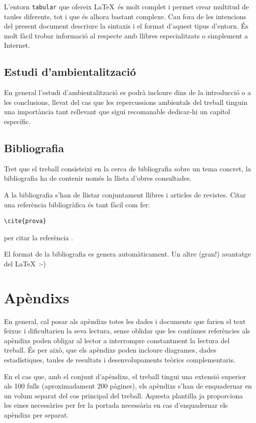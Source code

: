 L'entorn \texttt{tabular} que ofereix \LaTeX \ és molt complet i permet crear multitud de taules diferents, tot i que és alhora bastant complexe. Cau fora de les intencions del present document descriure la sintaxis i el format d'aquest tipus d'entorn. És molt fàcil trobar informació al respecte amb llibres especialitzats o simplement a Internet. 


\subsection{Estudi d'ambientalització}

En general l'estudi d'ambientalització es podrà incloure dins de la introducció o a les conclusions, llevat del cas que les repercussions ambientals del treball tinguin una importància tant rellevant que sigui recomanable dedicar-hi un capítol específic.


\subsection{Bibliografia}

Tret que el treball consisteixi en la cerca de bibliografia sobre un tema concret, la bibliografia ha de contenir només la llista d'obres consultades.

A la bibliografia s'han de llistar conjuntament llibres i articles de revistes. Citar una referència bibliogràfica és tant fàcil com fer:

\begin{verbatim}
\cite{prova}
\end{verbatim}

per citar la referència \cite{prova}.

El format de la bibliografia es genera automàticament. Un altre (gran!) avantatge del \LaTeX \ :-)


\section{Apèndixs}

En general, cal posar als apèndixs totes les dades i documents que farien el text feixuc i dificultarien la seva lectura, sense oblidar que les contínues referències als apèndixs poden obligar al lector a interrompre constantment la lectura del treball. És per això, que els apèndixs poden incloure diagrames, dades estadístiques, taules de resultats i desenvolupaments teòrics complementaris.

En el cas que, amb el conjunt d'apèndixs, el treball tingui una extensió superior als 100 fulls (aproximadament 200 pàgines), els apèndixs s'han de enquadernar en un volum separat del cos principal del treball. Aquesta plantilla ja proporciona les eines necessàries per fer la portada necessària en cas d'enquadernar els apèndixs per separat.
